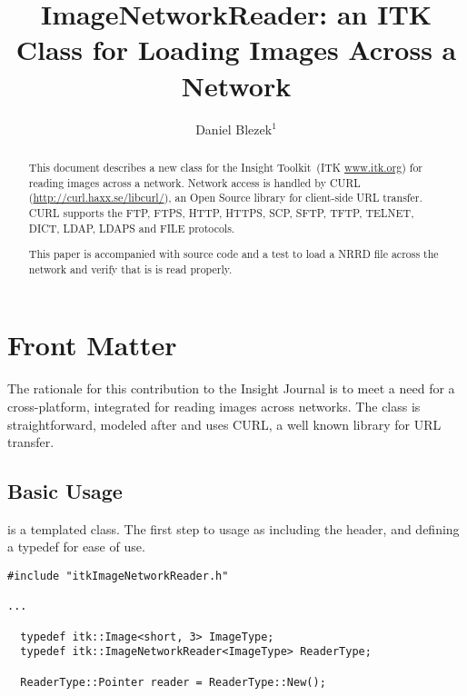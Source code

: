 \documentclass{InsightArticle}
\title{ImageNetworkReader: an ITK Class for Loading Images Across a Network}
\author{Daniel Blezek$^{1}$}
\begin{document}
%
% 


\maketitle


\ifhtml
\chapter*{Front Matter\label{front}}
\fi


\begin{abstract}
\noindent
This document describes a new class for the Insight Toolkit~(ITK \url{www.itk.org}) for reading images across a network.  Network access
is handled by CURL (\url{http://curl.haxx.se/libcurl/}), an Open Source library for client-side URL transfer.  CURL supports the FTP,
FTPS, HTTP, HTTPS, SCP, SFTP, TFTP, TELNET, DICT, LDAP, LDAPS and FILE protocols.

This paper is accompanied with source code and a test to load a NRRD file across the network and verify that is is read properly.

\end{abstract}


\tableofcontents

The rationale for this contribution to the Insight Journal is to meet a need for a cross-platform, integrated  for reading
images across networks.  The class is straightforward, modeled after  and uses CURL, a well known library for URL transfer.

\section{Basic Usage}

 is a templated class.  The first step to usage as including the header, and defining a typedef for ease of use.

\begin{verbatim}
#include "itkImageNetworkReader.h"

...

  typedef itk::Image<short, 3> ImageType;
  typedef itk::ImageNetworkReader<ImageType> ReaderType;

  ReaderType::Pointer reader = ReaderType::New();
\end{verbatim}
\end{document}
